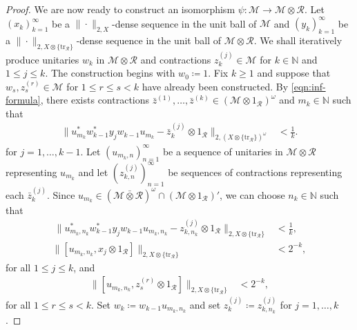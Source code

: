 \documentclass[a4paper,11pt]{amsart}
\theoremstyle{definition}
\numberwithin{equation}{section}
\numberwithin{theorem}{section}
\newcommand{\R}{\mathcal R}
\newcommand{\N}{\mathbb N}
\newcommand{\tr}{\mathrm{tr}}
\newcommand{\M}{\mathcal{M}}
\newcommand{\barotimes}{\bar\otimes}
\begin{document}
\begin{proof}
We are now ready to construct an isomorphism $\psi\colon \M \rightarrow \M \otimes \R$. 
Let $(x_k)_{k=1}^\infty$ be a $\|\cdot\|_{2,X}$-dense sequence in the unit ball of $\M$ and $(y_k)_{k=1}^\infty$ be a $\|\cdot\|_{2,X \otimes \{\tr_\R\}}$-dense sequence in the unit ball of $\M \otimes \R$. 
We shall iteratively produce unitaries $w_k$ in $\M \otimes \R$ and contractions $z_k^{(j)} \in \M$ for $k\in\mathbb N$ and $1 \leq j \leq k$.
The construction begins with $w_0 \coloneqq 1$. Fix $k \geq 1$ and suppose that $w_s, z^{(r)}_s \in \M$ for $1 \leq r \leq s < k$ have already been constructed.
By \eqref{eqn:inf-formula}, there exists contractions $\bar{z}^{(1)},\ldots,\bar{z}^{(k)} \in  (\M \otimes 1_\R)^\omega$ and $m_k \in \N$ such that
\begin{equation}\begin{split}
	\|u_{m_k}^* w_{k-1}^* y_j w_{k-1}u_{m_k} - \bar{z}_k^{(j)} \otimes 1_\R\|_{2,(X \otimes \{\tr_\R\})^\omega} &< \frac{1}{k}.
\end{split}\end{equation}
for $j=1,\ldots,k-1$.
Let $(u_{m_k,n})_{n=1}^\infty$ be a sequence of unitaries in $\M \otimes \R$ representing $u_{m_k}$ and let $(z^{(j)}_{k,n})_{n=1}^\infty$ be sequences of contractions representing each $\bar{z}_k^{(j)}$. 
Since $u_{m_k} \in (\M \barotimes \R)^\omega \cap (\M \otimes 1_\R)'$, we can choose $n_k \in \N$ such that
\begin{align}\
	\|u_{m_k,n_k}^* w_{k-1}^* y_j w_{k-1}u_{m_k,n_k} - z^{(j)}_{k,n_k} \otimes 1_\R\|_{2,X \otimes \{\tr_\R\}} &< \frac{1}{k},
	\label{eqn:inductive-McDuff1}\\
	\|[u_{m_k,n_k},x_j\otimes 1_\R]\|_{2,X \otimes \{\tr_\R\}} &< 2^{-k}, \label{eqn:inductive-McDuff2}
\end{align}
for all $1 \leq j \leq k$, and 
\begin{equation}\begin{split}\label{eqn:inductive-McDuff3}
	\|[u_{m_k,n_k},z^{(r)}_{s}\otimes 1_\R]\|_{2,X \otimes \{\tr_\R\}} &< 2^{-k},
\end{split}\end{equation}
for all $1\leq r \leq s < k$. 
Set $w_k \coloneqq w_{k-1}u_{m_k,n_k}$ and set $z^{(j)}_k \coloneqq z^{(j)}_{k,n_k}$ for $j=1,\ldots,k$.


\end{proof}
\end{document}
